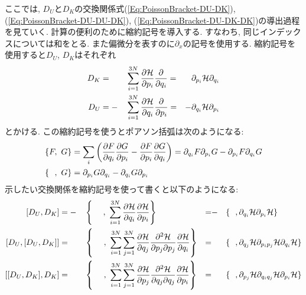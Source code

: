ここでは, $D_{U}$と$D_{K}$の交換関係式(\ref{Eq:PoissonBracket-DU-DK}), (\ref{Eq:PoissonBracket-DU-DU-DK}), (\ref{Eq:PoissonBracket-DU-DK-DK})の導出過程を見ていく.
計算の便利のために縮約記号を導入する.
すなわち, 同じインデックスについては和をとる. また偏微分を表すのに$\partial_{x}$の記号を使用する. 縮約記号を使用すると$D_{U}$, $D_{K}$はそれぞれ
\begin{alignat}{4}
  D_{K}
  &= &&
  \sum_{i=1}^{3N}
  \frac{\partial \mathcal{H}}{\partial p_{i}}
  \frac{\partial}{\partial q_{i}}
  =&
  \partial_{p_{i}} \mathcal{H} \partial_{q_{i}}
  \notag \\
  D_{U}
  &= -&&
  \sum_{i=1}^{3N}
  \frac{\partial \mathcal{H}}{\partial q_{i}}
  \frac{\partial}{\partial p_{i}}
  =&
  -
  \partial_{q_{i}} \mathcal{H} \partial_{p_{i}}
  \notag
\end{alignat}
とかける.
この縮約記号を使うとポアソン括弧は次のようになる:
\begin{align}
  \left\{
    F,~G
  \right\}
  &=
  \sum_{i}
  \left(
    \frac{\partial F}{\partial q_{i}}
    \frac{\partial G}{\partial p_{i}}
    -
    \frac{\partial F}{\partial p_{i}}
    \frac{\partial G}{\partial q_{i}}
  \right)
  =
  \partial_{q_{i}} F \partial_{p_{i}} G
  -
  \partial_{p_{i}} F \partial_{q_{i}} G
  \notag \\
  \left\{
    ~~,~G
  \right\}
  &=
  \partial_{p_{i}} G
  \partial_{q_{i}}
  -
  \partial_{q_{i}} G
  \partial_{p_{i}}
  \notag
\end{align}
示したい交換関係を縮約記号を使って書くと以下のようになる:
\begin{alignat}{4}
  [D_{U}, D_{K}]
  &=
  -&&
  \left\{
    ~~~~,~
    \sum_{i=1}^{3N}
    \frac{\partial \mathcal{H}}{\partial q_{i}}
    \frac{\partial \mathcal{H}}{\partial p_{i}}
  \right\}
  &=&- &&
  \{~~,
    \partial_{q_{i}} \mathcal{H}
    \partial_{p_{i}} \mathcal{H}
  \}
  \notag \\
  [D_{U}, [D_{U}, D_{K}]]
  &=&&
  \left\{
    ~~~~,~
    \sum_{i=1}^{3N} \sum_{j=1}^{3N}
    \frac{\partial \mathcal{H}}{\partial q_{j}}
    \frac{\partial^{2} \mathcal{H}}{\partial p_{j} \partial p_{j}}
    \frac{\partial \mathcal{H}}{\partial q_{i}}
  \right\}
  &=& &&
  \{~~,
    \partial_{q_{j}}       \mathcal{H}
    \partial_{p_{i} p_{j}} \mathcal{H}
    \partial_{q_{i}}       \mathcal{H}
  \}
  \notag \\
  [[D_{U}, D_{K}], D_{K}]
  &=&&
  \left\{
    ~~~~,~
    \sum_{i=1}^{3N} \sum_{j=1}^{3N}
    \frac{\partial \mathcal{H}}{\partial p_{j}}
    \frac{\partial^{2} \mathcal{H}}{\partial q_{j} \partial q_{j}}
    \frac{\partial \mathcal{H}}{\partial p_{i}}
  \right\}
  &=& &&
  \{~~,
    \partial_{p_{j}}       \mathcal{H}
    \partial_{q_{i} q_{j}} \mathcal{H}
    \partial_{p_{i}}       \mathcal{H}
  \}
  \notag
\end{alignat}

